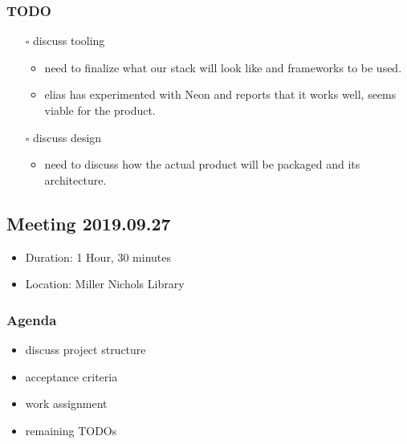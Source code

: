 \documentclass[11pt]{article}
\begin{document}
\subsubsection*{{\bfseries\sffamily TODO} }
\label{sec:org2f8ddcd}
\begin{itemize}
\item[{$\square$}] discuss tooling
\begin{itemize}
\item need to finalize what our stack will look like and frameworks to be
used.
\item elias has experimented with Neon and reports that it works well, seems
viable for the product.
\end{itemize}
\item[{$\square$}] discuss design
\begin{itemize}
\item need to discuss how the actual product will be packaged and its
architecture.
\end{itemize}
\end{itemize}
\subsection{Meeting 2019.09.27}
\label{sec:orgb85f8e8}
\begin{itemize}
\item Duration: 1 Hour, 30 minutes
\item Location: Miller Nichols Library
\end{itemize}
\subsubsection*{Agenda}
\label{sec:org4716552}
\begin{itemize}
\item discuss project structure
\item acceptance criteria
\item work assignment
\item remaining TODOs
\end{itemize}
\end{document}
